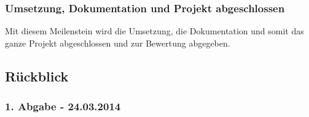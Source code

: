 \subsubsection{Umsetzung, Dokumentation und Projekt abgeschlossen}
Mit diesem Meilenstein wird die Umsetzung, die Dokumentation und somit das ganze Projekt abgeschlossen und zur Bewertung abgegeben.

\subsection{Rückblick}
\subsubsection{1. Abgabe - 24.03.2014}
